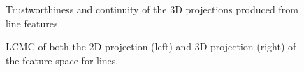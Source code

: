 \begin{figure}[H]
	\centering
	\caption{Trustworthiness and continuity of the 3D projections produced from line features.}\label{fig:TC_3d_lines}
\end{figure}

\begin{figure}[H]
	\centering
	\caption{LCMC of both the 2D projection (left) and 3D projection (right) of the feature space for lines.}\label{fig:LCMC_lines}
\end{figure}
\clearpage

